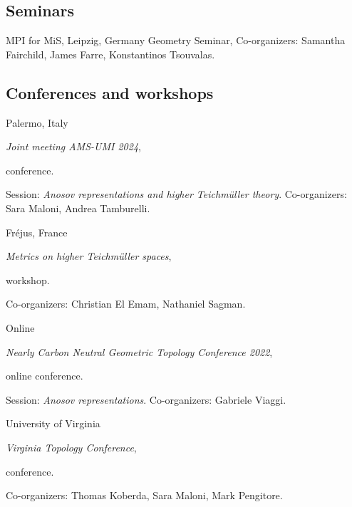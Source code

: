 
\subsection{Seminars}

{MPI for MiS, Leipzig, Germany}
{Geometry Seminar,}
{Co-organizers: Samantha Fairchild, James Farre, Konstantinos Tsouvalas.}

\subsection{Conferences and workshops}

{Palermo, Italy}
{\emph{Joint meeting AMS-UMI 2024}, \begin{footnotesize}
		conference.
\end{footnotesize}}
{Session: \emph{Anosov representations and higher Teichm\"uller theory}. Co-organizers: Sara Maloni, Andrea Tamburelli.}

{Fr\'ejus, France}
{\emph{Metrics on higher Teichm\"uller spaces}, \begin{footnotesize}
		workshop.
\end{footnotesize}}
{Co-organizers: Christian El Emam, Nathaniel Sagman.}

{Online}
{\emph{Nearly Carbon Neutral Geometric Topology Conference 2022}, \begin{footnotesize}
		online conference.
\end{footnotesize}}
{Session: \emph{Anosov representations}. Co-organizers: Gabriele Viaggi.}

{University of Virginia}
{\emph{Virginia Topology Conference}, \begin{footnotesize}
		conference.
\end{footnotesize}}
{Co-organizers: Thomas Koberda, Sara Maloni, Mark Pengitore.}
%